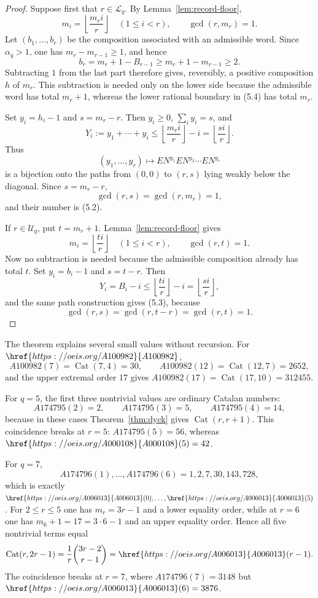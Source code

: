 \documentclass[11pt]{article}
\newcommand{\OEIS}[1]{\href{https://oeis.org/#1}{#1}}
\newcommand{\Lq}{\mathcal L}
\newcommand{\Uq}{\mathcal U}
\newcommand{\Cat}{\operatorname{Cat}}
\begin{document}
\begin{proof}
Suppose first that \(r\in\Lq_q\). By Lemma~\ref{lem:record-floor},
\[
 m_i=\left\lfloor\frac{m_ri}{r}\right\rfloor
 \quad(1\leq i<r),
 \qquad
 \gcd(r,m_r)=1.
 \tag{5.4}
\]
Let \((b_1,\ldots,b_r)\) be the composition associated with an admissible
word. Since \(\alpha_q>1\), one has \(m_r-m_{r-1}\geq1\), and hence
\[
 b_r=m_r+1-B_{r-1}
 \geq m_r+1-m_{r-1}\geq2.
\]
Subtracting \(1\) from the last part therefore gives, reversibly, a positive
composition \(h\) of \(m_r\). This subtraction is needed only on the lower
side because the admissible word has total \(m_r+1\), whereas the lower
rational boundary in (5.4) has total \(m_r\).

Set \(y_i=h_i-1\) and \(s=m_r-r\). Then \(y_i\geq0\),
\(\sum_i y_i=s\), and
\[
 Y_i:=y_1+\cdots+y_i
 \leq
 \left\lfloor\frac{m_ri}{r}\right\rfloor-i
 =\left\lfloor\frac{si}{r}\right\rfloor.
\]
Thus
\[
 (y_1,\ldots,y_r)
 \longmapsto
 E N^{y_1}E N^{y_2}\cdots E N^{y_r}
\]
is a bijection onto the paths from \((0,0)\) to \((r,s)\) lying weakly
below the diagonal. Since \(s=m_r-r\),
\[
 \gcd(r,s)=\gcd(r,m_r)=1,
\]
and their number is (5.2).

If \(r\in\Uq_q\), put \(t=m_r+1\). Lemma~\ref{lem:record-floor} gives
\[
 m_i=\left\lfloor\frac{ti}{r}\right\rfloor
 \quad(1\leq i<r),
 \qquad
 \gcd(r,t)=1.
 \tag{5.5}
\]
Now no subtraction is needed because the admissible composition already
has total \(t\). Set \(y_i=b_i-1\) and \(s=t-r\). Then
\[
 Y_i=B_i-i
 \leq
 \left\lfloor\frac{ti}{r}\right\rfloor-i
 =\left\lfloor\frac{si}{r}\right\rfloor,
\]
and the same path construction gives (5.3), because
\[
 \gcd(r,s)=\gcd(r,t-r)=\gcd(r,t)=1.
\]
\end{proof}

The theorem explains several small values without recursion. For
\(\OEIS{A100982}\),
\[
 A100982(7)=\Cat(7,4)=30,\qquad
 A100982(12)=\Cat(12,7)=2652,
\]
and the upper extremal order \(17\) gives
\(A100982(17)=\Cat(17,10)=312455\).

For \(q=5\), the first three nontrivial values are ordinary Catalan numbers:
\[
 A174795(2)=2,\qquad A174795(3)=5,\qquad A174795(4)=14,
\]
because in these cases Theorem~\ref{thm:dyck} gives \(\Cat(r,r+1)\).
This coincidence breaks at \(r=5\): \(A174795(5)=56\), whereas
\(\OEIS{A000108}(5)=42\).

For \(q=7\),
\[
 A174796(1),\ldots,A174796(6)=1,2,7,30,143,728,
\]
which is exactly \(\OEIS{A006013}(0),\ldots,\OEIS{A006013}(5)\). For \(2\leq r\leq5\)
one has \(m_r=3r-1\) and a lower equality order, while at \(r=6\) one has
\(m_6+1=17=3\cdot6-1\) and an upper equality order. Hence all five nontrivial
terms equal
\[
 \Cat(r,2r-1)
 =\frac1r\binom{3r-2}{r-1}
 =\OEIS{A006013}(r-1).
\]
The coincidence breaks at \(r=7\), where \(A174796(7)=3148\) but
\(\OEIS{A006013}(6)=3876\).
\end{document}
